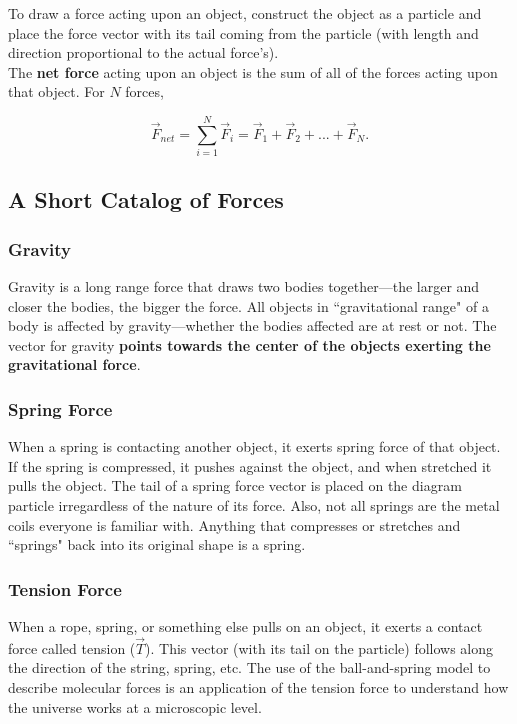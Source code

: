 \documentclass[12pt,letterpaper]{article}
\begin{document}
To draw a force acting upon an object, construct the object as a particle and place the force vector with its tail coming from the particle (with length and direction proportional to the actual force's). \\

The \textbf{net force} acting upon an object is the sum of all of the forces acting upon that object. For $N$ forces,

\begin{center}
	$$\vec{F}_{net} = \sum_{i = 1}^{N} \vec{F}_{i} = \vec{F}_{1} + \vec{F}_{2} + ... + \vec{F}_{N}.$$\linebreak
\end{center}

\subsection[A Short Catalog of Forces]{A Short Catalog of Forces}

\subsubsection{Gravity} 

Gravity is a long range force that draws two bodies together---the larger and closer the bodies, the bigger the force. All objects in ``gravitational range" of a body is affected by gravity---whether the bodies affected are at rest or not. The vector for gravity \textbf{points towards the center of the objects exerting the gravitational force}.

\subsubsection{Spring Force} 

When a spring is contacting another object, it exerts spring force of that object. If the spring is compressed, it pushes against the object, and when stretched it pulls the object. The tail of a spring force vector is placed on the diagram particle irregardless of the nature of its force. Also, not all springs are the metal coils everyone is familiar with. Anything that compresses or stretches and ``springs" back into its original shape is a spring.

\subsubsection{Tension Force}

When a rope, spring, or something else pulls on an object, it exerts a contact force called tension ($\vec{T}$). This vector (with its tail on the particle) follows along the direction of the string, spring, etc. The use of the ball-and-spring model to describe molecular forces is an application of the tension force to understand how the universe works at a microscopic level.
\end{document}
